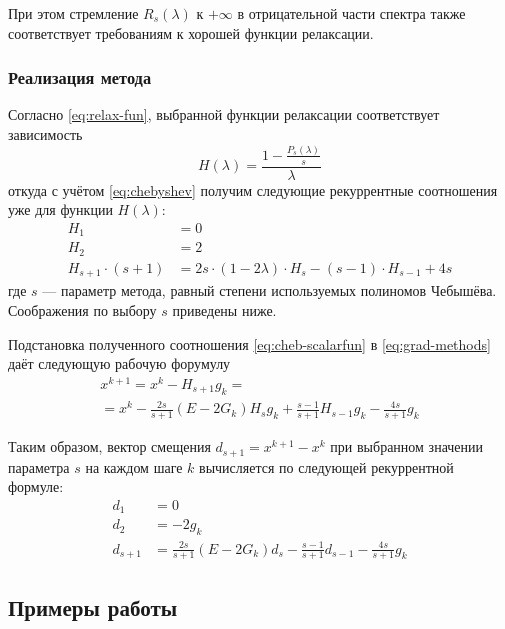 \documentclass{article}
\newcommand{\mul}{\cdot}
\theoremstyle{remark}
\theoremstyle{definition}
\numberwithin{equation}{section}
\begin{document}
При этом стремление $R_s(\lambda)$ к $+\infty$ в
отрицательной части спектра также соответствует требованиям к хорошей
функции релаксации.

\subsubsection{Реализация метода}
Согласно \eqref{eq:relax-fun}, выбранной функции релаксации
соответствует зависимость
\begin{equation*}
  H(\lambda) = \frac{1-\frac{P_s(\lambda)}{s}}{\lambda}
\end{equation*}
откуда с учётом \eqref{eq:chebyshev} получим следующие рекуррентные
соотношения уже для функции $H(\lambda)$:
\begin{equation}
  \label{eq:cheb-scalarfun}
  \begin{aligned}
    H_1 &= 0 \\
    H_2 &= 2 \\
    H_{s+1} \mul (s+1) &= 2s\mul(1-2\lambda)\mul H_s-(s-1)\mul
    H_{s-1}+4s
  \end{aligned}
\end{equation}
где $s$ — параметр метода, равный степени используемых полиномов
Чебышёва. Соображения по выбору $s$ приведены ниже.

Подстановка полученного соотношения \eqref{eq:cheb-scalarfun}
в \eqref{eq:grad-methods} даёт следующую рабочую форумулу
\begin{multline}
  x^{k+1} = x^k - H_{s+1}g_k =\\=
  x^k-\frac{2s}{s+1}(E-2G_k)H_sg_k+\frac{s-1}{s+1}H_{s-1}g_k-\frac{4s}{s+1}g_k
\end{multline}

Таким образом, вектор смещения $d_{s+1} = x^{k+1} - x^k$ при выбранном
значении параметра $s$ на каждом шаге $k$ вычисляется по следующей
рекуррентной формуле:
\begin{equation}
  \label{eq:cheb-workhorse}
  \begin{aligned}
    d_1 &= 0\\
    d_2 &= -2g_k \\
    d_{s+1} &=
    \frac{2s}{s+1}(E-2G_k)d_{s}-\frac{s-1}{s+1}d_{s-1}-\frac{4s}{s+1}g_k
  \end{aligned}
\end{equation}


\clearpage
\subsection{Примеры работы}
\end{document}

